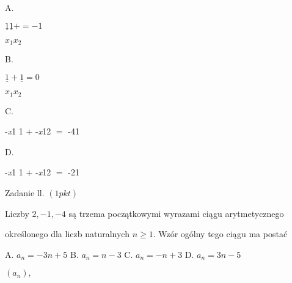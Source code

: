 \documentclass[a4paper,12pt]{article}
\begin{document}
A.

$\underline{1}\underline{1}+=-1$

$x_{1} x_{2}$

B.

$\underline{1}+\underline{1}=0$

$x_{1} x_{2}$

C.

-{\it x}1  1 $+$ -{\it x}12 $=$ -41

D.

-{\it x}1  1 $+$ -{\it x}12 $=$ -21

Zadanie ll. $(1pkt)$

Liczby $2, -1, -4$ są trzema początkowymi wyrazami ciągu arytmetycznego

określonego dla liczb naturalnych $n\geq 1$. Wzór ogólny tego ciągu ma postać

A. $a_{n}=-3n+5$ B. $a_{n}=n-3$ C. $a_{n}=-n+3$ D. $a_{n}=3n-5$

$(a_{n}),$
\end{document}
